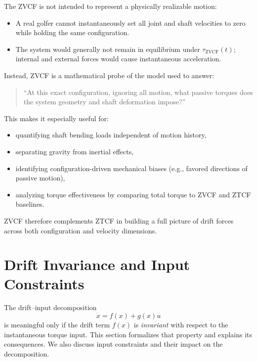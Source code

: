 \documentclass[12pt]{article}
\newcommand{\xd}{\dot{x}}
\begin{document}
The ZVCF is not intended to represent a physically realizable motion:
\begin{itemize}
  \item A real golfer cannot instantaneously set all joint and shaft velocities to zero while holding the same configuration.
  \item The system would generally not remain in equilibrium under \(\tau_{\mathrm{ZVCF}}(t)\); internal and external forces would cause instantaneous acceleration.
\end{itemize}

Instead, ZVCF is a mathematical probe of the model used to answer:
\begin{quote}
``At this exact configuration, ignoring all motion, what passive torques does the system geometry and shaft deformation impose?''
\end{quote}

This makes it especially useful for:
\begin{itemize}
  \item quantifying shaft bending loads independent of motion history,
  \item separating gravity from inertial effects,
  \item identifying configuration-driven mechanical biases (e.g., favored directions of passive motion),
  \item analyzing torque effectiveness by comparing total torque to ZVCF and ZTCF baselines.
\end{itemize}

ZVCF therefore complements ZTCF in building a full picture of drift forces across both configuration and velocity dimensions.

\section{Drift Invariance and Input Constraints}
\label{sec:drift_invariance}

The drift--input decomposition
\begin{equation}
  \xd = f(x) + g(x)u
\end{equation}
is meaningful only if the drift term \(f(x)\) is \emph{invariant} with respect to the instantaneous torque input. This section formalizes that property and explains its consequences. We also discuss input constraints and their impact on the decomposition.
\end{document}
